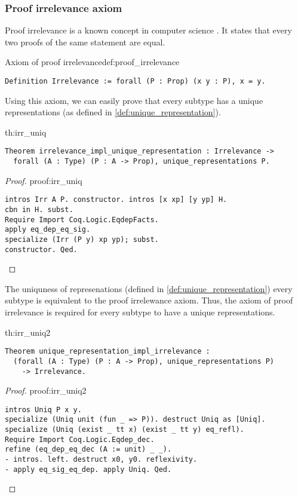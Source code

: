 \subsubsection{Proof irrelevance axiom}
Proof irrelevance is a known concept in computer science \cite{ProofIrrelevance}. It states that every two proofs of the same statement are equal.
\begin{defi}{Axiom of proof irrelevance}{def:proof_irrelevance}
\begin{verbatim}
Definition Irrelevance := forall (P : Prop) (x y : P), x = y.
\end{verbatim}
\end{defi}
Using this axiom, we can easily prove that every subtype has a unique representations (as defined in \ref{def:unique_representation}).
\begin{theo}{}{th:irr_uniq}
    \begin{verbatim}
Theorem irrelevance_impl_unique_representation : Irrelevance -> 
  forall (A : Type) (P : A -> Prop), unique_representations P.
    \end{verbatim}
\end{theo}
\begin{proof}{}{proof:irr_uniq}
    \begin{verbatim}
intros Irr A P. constructor. intros [x xp] [y yp] H.
cbn in H. subst.
Require Import Coq.Logic.EqdepFacts.
apply eq_dep_eq_sig.
specialize (Irr (P y) xp yp); subst.
constructor. Qed.
\end{verbatim}
\end{proof}
The uniquness of represenations (defined in \ref{def:unique_representation}) every subtype is equivalent to the proof irrelewance axiom. Thus, the axiom of proof irrelevance is required for every subtype to have a unique representations.
\begin{theo}{}{th:irr_uniq2}
    \begin{verbatim}
Theorem unique_representation_impl_irrelevance : 
  (forall (A : Type) (P : A -> Prop), unique_representations P) 
    -> Irrelevance.
    \end{verbatim}
\end{theo}
\begin{proof}{}{proof:irr_uniq2}
    \begin{verbatim}
intros Uniq P x y.
specialize (Uniq unit (fun _ => P)). destruct Uniq as [Uniq].
specialize (Uniq (exist _ tt x) (exist _ tt y) eq_refl).
Require Import Coq.Logic.Eqdep_dec.
refine (eq_dep_eq_dec (A := unit) _ _).
- intros. left. destruct x0, y0. reflexivity.
- apply eq_sig_eq_dep. apply Uniq. Qed.
\end{verbatim}
\end{proof}
